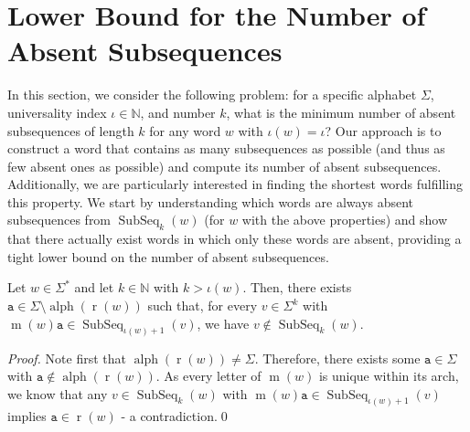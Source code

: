 \documentclass[runningheads,UKenglish,cleveref, autoref, thm-restate]{llncs}
\newcommand{\N}{\mathbb{N}}
\def\ta{\mathtt{a}}
\def\r{\operatorname{r}}
\def\m{\operatorname{m}}
\DeclareMathOperator{\alphabet}{alph}
\DeclareMathOperator{\al}{alph}
\DeclareMathOperator\ScatFact{SubSeq}
\newif\ifpaper
\begin{document}
	\section{Lower Bound for the Number of Absent Subsequences}\label{sec:lowbound}
In this section, we consider the following problem: for a specific alphabet $\Sigma$, universality index $\iota\in\N$, and number $k$, what is the minimum number of absent subsequences of length $k$ for any word $w$ with $\iota(w) = \iota$? Our approach is to construct a word that contains as many subsequences as possible (and thus as few absent ones as possible) and compute its number of absent subsequences. Additionally, we are particularly interested in finding the shortest words fulfilling this property. We start by understanding which words are always absent subsequences from $\ScatFact_k(w)$ (for $w$ with the above properties) and show that there actually exist words in which only these words are absent, providing a tight lower bound on the number of absent subsequences.

\ifpaper
\else 
\begin{lemma}\label{lemma:atleast-absent-sf}
    Let $ w \in \Sigma^*$ and let $k \in \N$ with $k > \iota(w)$. Then, there exists $\ta \in \Sigma\setminus \al(\r(w))$ such that, for every $v \in \Sigma^k$ with $\m(w)\ta \in \ScatFact_{\iota(w)+1}(v)$, we have $v\notin\ScatFact_k(w)$.
\end{lemma}

\begin{proof}
    Note first that $\alphabet(\r(w)) \neq \Sigma$. Therefore, there exists some $\ta\in\Sigma$ with $\ta\notin\alphabet(\r(w))$. As every letter of $\m(w)$ is unique within its arch, we know that any $v\in\ScatFact_k(w)$
    with $\m(w) \ta \in \ScatFact_{\iota(w)+1}(v)$ implies $\ta\in\r(w)$ - a contradiction.\qed
\end{proof}

\fi

\end{document}
